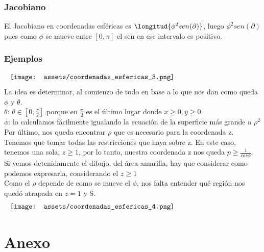 \documentclass[10pt,a4paper]{article}
\begin{document}
\subsubsection*{Jacobiano}
El Jacobiano en coordenadas esféricas es $\longitud{\phi^{2} sen(\partial)}$, luego $\phi^{2} sen(\partial)$ pues como $\phi$ se mueve entre $[0, \pi]$ el sen en ese intervalo es positivo.
\subsubsection*{Ejemplos}
\[\begin{minipage}[b]{1\textwidth}
    \texttt{[image: assets/coordenadas\_esfericas\_3.png]}
\end{minipage}\]
La idea es determinar, al comienzo de todo en base a lo que nos dan como queda $\phi$ y $\theta$. \\
$\theta$: $\theta \in [0, \frac{\pi}{2}]$ porque en $\frac{\pi}{2}$ es el último lugar donde $x \ge 0, y \ge 0$. \\
$\phi$: lo calculamos fácilmente igualando la ecuación de la superficie más grande a $\rho^{2}$ \\
Por último, nos queda encontrar $\rho$ que es necesario para la coordenada z. Tenemos que tomar todas las restricciones que haya sobre z. En este caso, tenemos una sola, $z \ge 1$, por lo tanto, nuestra coordenada z nos queda $p \ge \frac{1}{cos \phi}$. Si vemos detenidamente el dibujo, del área amarilla, hay que considerar como podemos expresarla, considerando el $z \ge 1$ \\
Como el $\rho$ depende de como se mueve el $\phi$, nos falta entender qué región nos quedó atrapada en $z = 1$ y S. 
\[\begin{minipage}[b]{1\textwidth}
    \texttt{[image: assets/coordenadas\_esfericas\_4.png]}
\end{minipage}\]
\section*{Anexo}
\end{document}
